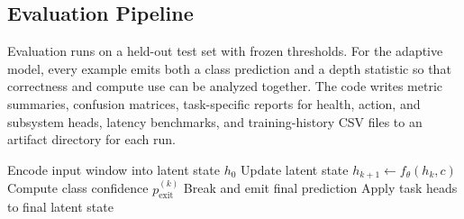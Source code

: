 \subsection{Evaluation Pipeline}
Evaluation runs on a held-out test set with frozen thresholds. For the adaptive model, every example emits both a class prediction and a depth statistic so that correctness and compute use can be analyzed together. The code writes metric summaries, confusion matrices, task-specific reports for health, action, and subsystem heads, latency benchmarks, and training-history CSV files to an artifact directory for each run.

\begin{algorithm}[t]
\caption{Adaptive looped maintenance inference}
\label{alg:adaptive}
\begin{algorithmic}[1]
\STATE Encode input window into latent state $h_0$
    \STATE Update latent state $h_{k+1} \leftarrow f_\theta(h_k, c)$
    \STATE Compute class confidence $p_{\text{exit}}^{(k)}$
        \STATE Break and emit final prediction
    \ENDIF
\ENDFOR
\STATE Apply task heads to final latent state
\end{algorithmic}
\end{algorithm}
